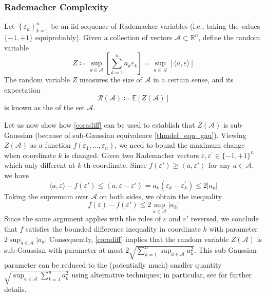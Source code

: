 \documentclass{article}
\begin{document}
\subsubsection{Rademacher Complexity}
Let $\left\{\varepsilon_{k}\right\}_{k=1}^{n}$ be an \gls{iid} sequence of Rademacher variables (i.e., taking the values $\{-1,+1\}$ equiprobably). Given a collection of vectors $\mathcal{A} \subset \mathbb{R}^{n}$, define the random variable
$$
Z\coloneqq\sup _{a \in \mathcal{A}}\left[\sum_{k=1}^{n} a_{k} \varepsilon_{k}\right]=\sup _{a \in \mathcal{A}}[\langle a, \varepsilon\rangle]
$$
The random variable $Z$ measures the size of $\mathcal{A}$ in a certain sense, and its expectation $$\mathcal{R}(\mathcal{A})\coloneqq\mathbb{E}[Z(\mathcal{A})]$$ is known as the  of the set $\mathcal{A}$.

Let us now show how \cref{coradiff} can be used to establish that $Z(\mathcal{A})$ is sub-Gaussian (because of sub-Gaussian equivalence \cref{thmdef_equ_gau}). Viewing $Z(\mathcal{A})$ as a function $f\left(\varepsilon_{1}, \ldots, \varepsilon_{n}\right)$, we need to bound the maximum
change when coordinate $k$ is changed. Given two Rademacher vectors $\varepsilon, \varepsilon^{\prime} \in\{-1,+1\}^{n}$ which only different at $k$-th coordinate. Since $f\left(\varepsilon'\right) \geq\left\langle a, \varepsilon'\right\rangle$ for any $a \in \mathcal{A}$, we have
$$
\langle a, \varepsilon\rangle-f\left(\varepsilon'\right) \leq\left\langle a, \varepsilon-\varepsilon'\right\rangle=a_{k}\left(\varepsilon_{k}-\varepsilon_{k}^{\prime}\right) \leq 2\left|a_{k}\right|
$$
Taking the supremum over $\mathcal{A}$ on both sides, we obtain the inequality
$$
f(\varepsilon)-f\left(\varepsilon'\right) \leq 2 \sup_{a\in\mathcal{A}} \left|a_{k}\right|
$$
Since the same argument applies with the roles of $\varepsilon$ and $\varepsilon'$ reversed, we conclude that $f$ satisfies the bounded difference inequality in coordinate $k$ with parameter $2 \sup _{a \in \mathcal{A}}\left|a_{k}\right|$ Consequently, \cref{coradiff} implies that the random variable $Z(\mathcal{A})$ is sub-Gaussian with parameter at most $2 \sqrt{\sum_{k=1}^{n} \sup _{a \in \mathcal{A}} a_{k}^{2}}$. This sub-Gaussian parameter can be reduced to the (potentially much) smaller quantity $\sqrt{\sup _{a \in \mathcal{A}} \sum_{k=1}^{n} a_{k}^{2}}$ using alternative techniques; in particular, see \cite[Example 3.5]{wainwright2019high} for further details.
\end{document}
